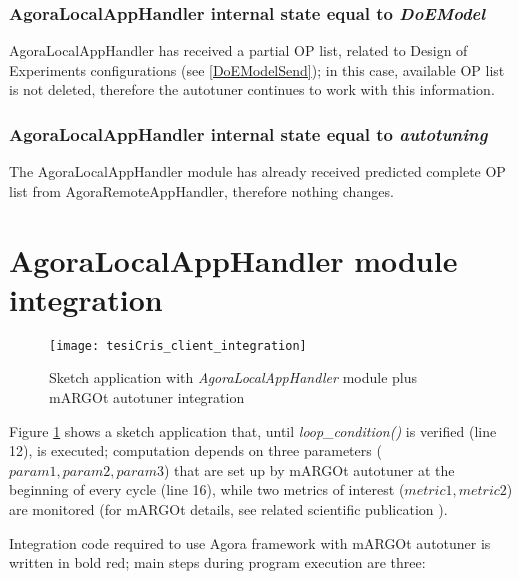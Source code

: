 \subsubsection{AgoraLocalAppHandler internal state equal to \textit{DoEModel}}

AgoraLocalAppHandler has received a partial OP list, related to Design of Experiments configurations (see \ref{DoEModelSend}); in this case, available OP list is not deleted, therefore the autotuner continues to work with this information.


\subsubsection{AgoraLocalAppHandler internal state equal to \textit{autotuning}}

The AgoraLocalAppHandler module has already received predicted complete OP list from AgoraRemoteAppHandler, therefore nothing changes.





\section{AgoraLocalAppHandler module integration}

\begin{figure}[H]

    \centering
    \texttt{[image: tesiCris\_client\_integration]}
    \caption{Sketch application with \textit{AgoraLocalAppHandler} module plus mARGOt autotuner integration}
    \label{fig::sketchApp}
    
\end{figure}

Figure \ref{fig::sketchApp} shows a sketch application that, until \textit{loop\_con\-di\-tion()} is verified (line 12), is executed; computation depends on three parameters ($param1, param2, param3$) that are set up by mARGOt autotuner at the beginning of every cycle (line 16), while two metrics of interest ($metric1, metric2$) are monitored (for mARGOt details, see related scientific publication \cite{gadioli2015application}).

Integration code required to use Agora framework with mARGOt autotuner is written in bold red; main steps during program execution are three:

